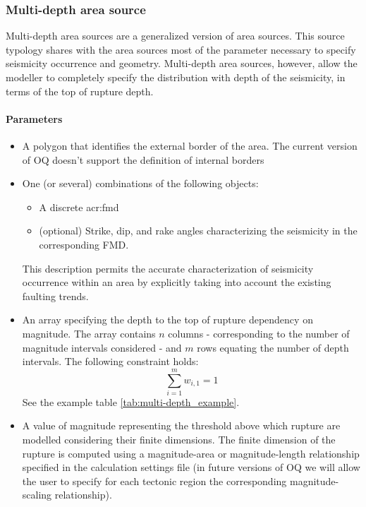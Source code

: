 \subsubsection[Multi-depth area sources]{Multi-depth area source}
\label{hazard:seismic_source_types:multiDepthAreaSources}
%
{\color{blue}
%
Multi-depth area sources are a generalized version of area sources. This
source typology shares with the area sources most of the parameter 
necessary to specify seismicity  occurrence and geometry. 
%
Multi-depth area sources, however, allow the modeller to completely specify 
the distribution with depth of the seismicity, in terms of the top of 
rupture depth.
%
\paragraph{Parameters}
\begin{itemize}
\item A polygon that identifies the external border of the area. 
The current version of OQ doesn't support the definition 
of internal borders
\item One (or several) combinations of the following objects:
\begin{itemize}
	\item A discrete \gls{acr:fmd}
	\item (optional) Strike, dip, and rake angles characterizing the 
	seismicity in the corresponding FMD.
\end{itemize}
%
This description permits the accurate characterization of seismicity 
occurrence within an area by explicitly taking into account the existing 
faulting trends. 
%
\item An array specifying the depth to the top of rupture dependency on 
magnitude. The array contains $n$ columns - corresponding to the number of 
magnitude intervals considered - and $m$ rows equating the number of depth
intervals. The following constraint holds:
\[\sum_{i=1}^{m}w_{i,1}=1\]
See the example table \ref{tab:multi-depth_example}.

%
\item A value of magnitude representing the threshold above which rupture 
are modelled considering their finite dimensions. The finite dimension of the 
rupture is computed using a magnitude-area or magnitude-length relationship 
specified in the calculation settings file (in future versions of OQ we will 
allow the user to specify for each tectonic region the corresponding 
magnitude-scaling relationship).
\end{itemize}
} \color{black} %
%
